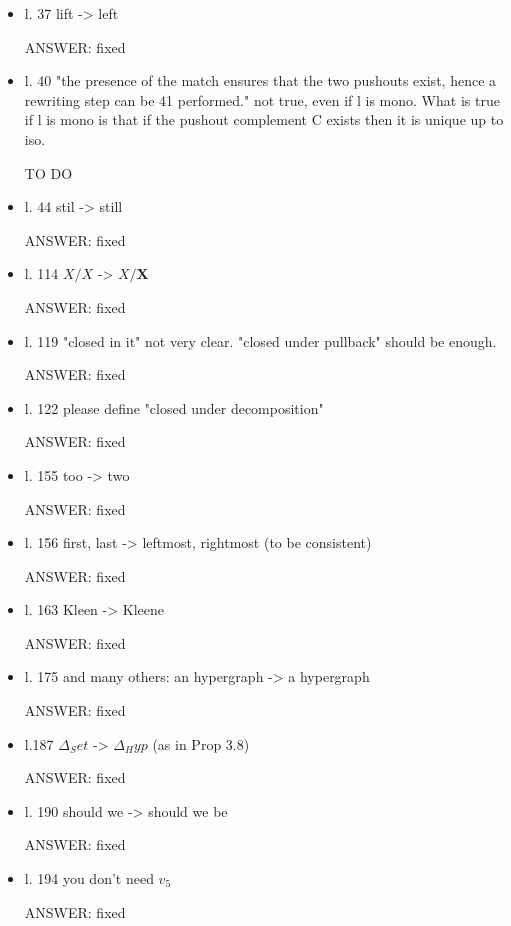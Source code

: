 \documentclass[english,11pt,a4paper]{article}
\begin{document}
\begin{itemize}
\item l. 37 lift -> left

ANSWER: fixed

\item l. 40 "the presence of the match ensures that the two pushouts exist,
hence a rewriting step can be 41 performed." not true, even if l is
mono. What is true if l is mono is that if the pushout complement C
exists then it is unique up to iso.

TO DO 

\item l. 44 stil -> still

ANSWER: fixed

\item l. 114 $X/X$ -> $X/\mathbf{X}$

ANSWER: fixed

\item l. 119 "closed in it" not very clear. "closed under pullback" should be enough.

ANSWER: fixed

\item l. 122 please define "closed under decomposition"

ANSWER: fixed

\item l. 155 too -> two

ANSWER: fixed


\item l. 156 first, last -> leftmost, rightmost (to be consistent)

ANSWER: fixed

\item l. 163 Kleen -> Kleene

ANSWER: fixed

\item l. 175 and many others: an hypergraph -> a hypergraph

ANSWER: fixed

\item l.187 $\Delta_Set$ -> $\Delta_Hyp$ (as in Prop 3.8)

ANSWER: fixed

\item l. 190 should we -> should we be

ANSWER: fixed

\item l. 194 you don't need $v_5$

ANSWER: fixed


\end{itemize}
\end{document}
